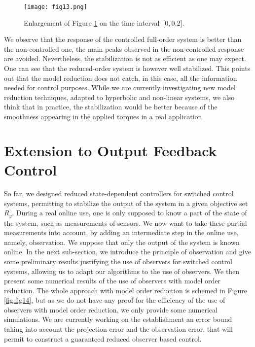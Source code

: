    \begin{figure}
   \centering
  \texttt{[image: fig13.png]}
  \caption{Enlargement of Figure \ref{fig:fig13} on the time interval~$\lbrack 0,0.2 \rbrack$.}
  \label{fig:fig13}
 \end{figure}
 We observe that the response of the controlled full-order system is better than the non-controlled
 one, the main peaks observed in the non-controlled response are avoided. Nevertheless,
 the stabilization is not as efficient as one may expect. One can see that the reduced-order
 system is however well stabilized. This points out that the model reduction does not
 catch, in this case, all the information needed for control purposes. While we are currently 
 investigating new model reduction techniques, adapted to hyperbolic and non-linear systems, 
 we also think that in practice, the stabilization would be better because of the
 smoothness appearing in the applied torques in a real application.
 
 
 

  \section{Extension to Output Feedback Control}
  \label{sec:observation}
  
 So far, we designed reduced state-dependent controllers for switched control systems, permitting to 
 stabilize the output of the system in a given objective set $R_y$. During a real online use, one 
 is only supposed to know a part of the state of the system, such as measurements of sensors.
 We now want to take these partial measurements into account, by adding an intermediate step in the
 online use, namely, observation. We suppose that only the output of the system is known online.
 In the next sub-section, we introduce the principle of observation and give some preliminary
 results justifying the use of observers for switched control systems, allowing us to adapt our 
 algorithms to the use of observers. We then present some numerical results of the use of observers 
 with model order reduction. The whole approach with model order reduction is schemed in
 Figure \ref{fig:fig14}, but as we do not have any proof for the efficiency of the
 use of observers with model order reduction, we only provide some numerical simulations. 
 We are currently working on the establishment an error bound taking into account the projection error
 and the observation error, that will permit to construct a guaranteed reduced observer based control.
  
